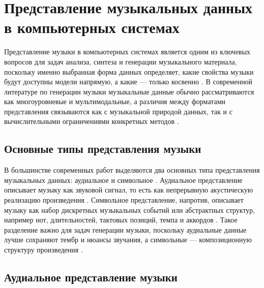 \documentclass[a4paper,12pt]{extarticle}
\begin{document}
\maketitle

\section{Представление музыкальных данных в компьютерных системах}
\label{sec:music_representation}

Представление музыки в компьютерных системах является одним из ключевых вопросов для задач анализа, синтеза и генерации музыкального материала, поскольку именно выбранная форма данных определяет, какие свойства музыки будут доступны модели напрямую, а какие --- только косвенно \cite{briot2017deep,ji2020comprehensive,duan2025recent}. 
В современной литературе по генерации музыки музыкальные данные обычно рассматриваются как многоуровневые и мультимодальные, а различия между форматами представления связываются как с музыкальной природой данных, так и с вычислительными ограничениями конкретных методов \cite{ji2020comprehensive,duan2025recent}. 

\subsection{Основные типы представления музыки}
\label{subsec:main_types_repr}

В большинстве современных работ выделяются два основных типа представления музыкальных данных: аудиальное и символьное \cite{briot2017deep,ji2020comprehensive,duan2025recent}. 
Аудиальное представление описывает музыку как звуковой сигнал, то есть как непрерывную акустическую реализацию произведения \cite{briot2017deep,ji2020comprehensive}. 
Символьное представление, напротив, описывает музыку как набор дискретных музыкальных событий или абстрактных структур, например нот, длительностей, тактовых позиций, темпа и аккордов \cite{ji2023symbolic,duan2025recent,ji2020comprehensive}. 
Такое разделение важно для задач генерации музыки, поскольку аудиальные данные лучше сохраняют тембр и нюансы звучания, а символьные --- композиционную структуру произведения \cite{ji2020comprehensive,duan2025recent,ji2023symbolic}. 

\subsection{Аудиальное представление музыки}
\label{subsec:audio_representation}
\end{document}
